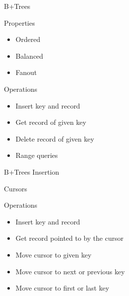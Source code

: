\documentclass[page number,usenames,dvipsnames]{beamer}
\def\spec#1{{\color{spec}\textbf{#1}}}
\def\prog#1{{\color{prog}\textbf{#1}}}
\begin{document}
\begin{frame}{B+Trees}
  \beforeinsert
  \vfill
  \begin{multicols}{2}
    \begin{exampleblock}{Properties}
      \begin{itemize}
      \item Ordered
      \item Balanced
      \item Fanout
      \end{itemize}
    \end{exampleblock}
      \begin{block}{Operations}
        \begin{itemize}
        \item Insert key and record
        \item Get record of given key
        \item {\color{mDarkRed}Delete record of given key}
        \item Range queries
        \end{itemize}
      \end{block}
  \end{multicols}

\end{frame}

\begin{frame}{B+Trees Insertion}
  \beforeinsert
  \vfill
  \pause
  \afterinsert
\end{frame}

\begin{frame}{Cursors}
  \cursor
  \vfill
  \begin{block}{Operations}
    \begin{itemize}
    \item Insert key and record
    \item Get record pointed to by the cursor
    \item Move cursor to given key
    \item Move cursor to next or previous key
    \item Move cursor to first or last key
    \end{itemize}
  \end{block}
\end{frame}

\newcommand{\hoare}[3]{\{\spec{$#1$}\}~\prog{$#2$}~\{\spec{$#3$}\}}
\end{document}
